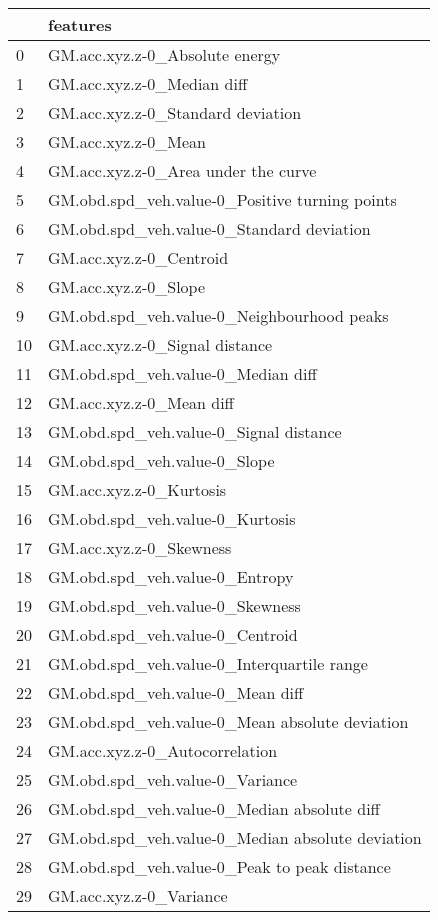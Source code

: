 \begin{tabular}{ll}
\toprule
{} &                                          features \\
\midrule
0  &                    GM.acc.xyz.z-0\_Absolute energy \\
1  &                        GM.acc.xyz.z-0\_Median diff \\
2  &                 GM.acc.xyz.z-0\_Standard deviation \\
3  &                               GM.acc.xyz.z-0\_Mean \\
4  &               GM.acc.xyz.z-0\_Area under the curve \\
5  &    GM.obd.spd\_veh.value-0\_Positive turning points \\
6  &         GM.obd.spd\_veh.value-0\_Standard deviation \\
7  &                           GM.acc.xyz.z-0\_Centroid \\
8  &                              GM.acc.xyz.z-0\_Slope \\
9  &        GM.obd.spd\_veh.value-0\_Neighbourhood peaks \\
10 &                    GM.acc.xyz.z-0\_Signal distance \\
11 &                GM.obd.spd\_veh.value-0\_Median diff \\
12 &                          GM.acc.xyz.z-0\_Mean diff \\
13 &            GM.obd.spd\_veh.value-0\_Signal distance \\
14 &                      GM.obd.spd\_veh.value-0\_Slope \\
15 &                           GM.acc.xyz.z-0\_Kurtosis \\
16 &                   GM.obd.spd\_veh.value-0\_Kurtosis \\
17 &                           GM.acc.xyz.z-0\_Skewness \\
18 &                    GM.obd.spd\_veh.value-0\_Entropy \\
19 &                   GM.obd.spd\_veh.value-0\_Skewness \\
20 &                   GM.obd.spd\_veh.value-0\_Centroid \\
21 &        GM.obd.spd\_veh.value-0\_Interquartile range \\
22 &                  GM.obd.spd\_veh.value-0\_Mean diff \\
23 &    GM.obd.spd\_veh.value-0\_Mean absolute deviation \\
24 &                    GM.acc.xyz.z-0\_Autocorrelation \\
25 &                   GM.obd.spd\_veh.value-0\_Variance \\
26 &       GM.obd.spd\_veh.value-0\_Median absolute diff \\
27 &  GM.obd.spd\_veh.value-0\_Median absolute deviation \\
28 &      GM.obd.spd\_veh.value-0\_Peak to peak distance \\
29 &                           GM.acc.xyz.z-0\_Variance \\
\bottomrule
\end{tabular}
